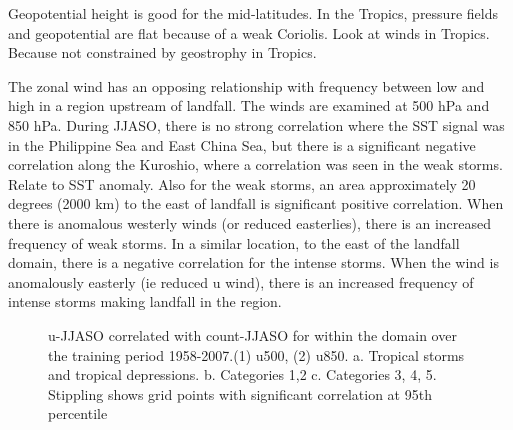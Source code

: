 Geopotential height is good for the mid-latitudes. In the Tropics, pressure fields and geopotential are flat because of a weak Coriolis. Look at winds in Tropics. Because not constrained by geostrophy in Tropics.

The zonal wind has an opposing relationship with frequency between low and high in a region upstream of landfall.
The winds are examined at 500 hPa and 850 hPa. 
During JJASO, there is no strong correlation where the SST signal was in the Philippine Sea and East China Sea, but there is a significant negative correlation along the Kuroshio, where a correlation was seen in the weak storms. Relate to SST anomaly. Also for the weak storms, an area approximately 20 degrees (2000 km) to the east of landfall is significant positive correlation. When there is anomalous westerly winds (or reduced easterlies), there is an increased frequency of weak storms. In a similar location, to the east of the landfall domain, there is a negative correlation for the intense storms. When the wind is anomalously easterly (ie reduced u wind), there is an increased frequency of intense storms making landfall in the region.


\begin{figure}
	\centering
	\subfloat[2a]{\texttt{[image: Y:/Code\_Data/Chapter1/Plots\_new/Corr\_maps\_final/count/inp\_int/u500/u500\_curr\_JJASO\&countJJASOplusinp\_intcorr\_total.png]}}

	\caption{u-JJASO correlated with count-JJASO for within the domain over the training period 1958-2007.(1) u500, (2) u850. a. Tropical storms and tropical depressions. b. Categories 1,2 c. Categories 3, 4, 5. Stippling shows grid points with significant correlation at 95th percentile} \label{fig:corr_curr_JJASO_u} 
\end{figure} 






